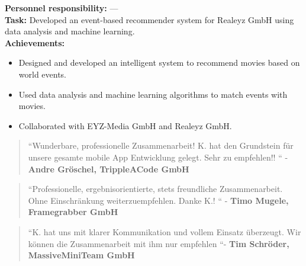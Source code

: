\documentclass[10pt,a4paper,normalphoto]{altacv}
\begin{document}
\begin{fullwidth}
\vspace{1em}


\vspace{2em}

\textbf{Personnel responsibility:} —\\
\textbf{Task:} Developed an event-based recommender system for Realeyz GmbH using data analysis and machine learning.\\
\textbf{Achievements:}
\begin{itemize}
    \item Designed and developed an intelligent system to recommend movies based on world events.
    \item Used data analysis and machine learning algorithms to match events with movies.
    \item Collaborated with EYZ-Media GmbH and Realeyz GmbH.
\end{itemize}

\vspace{1em}



\begin{quote}
``Wunderbare, professionelle Zusammenarbeit! K. hat den Grundstein für unsere gesamte mobile App Entwicklung gelegt. Sehr zu empfehlen!! `` - \textbf{Andre Gröschel, TrippleACode GmbH}\\
\end{quote}
\vspace{.5em}
\begin{quote}
``Professionelle, ergebnisorientierte, stets freundliche Zusammenarbeit. Ohne Einschränkung weiterzuempfehlen. Danke K.! `` - \textbf{Timo Mugele, Framegrabber GmbH}\\
\end{quote}

\vspace{.5em}

\begin{quote}
``K. hat uns mit klarer Kommunikation und vollem Einsatz überzeugt. Wir können die Zusammenarbeit mit ihm nur empfehlen ``- \textbf{Tim Schröder, MassiveMiniTeam GmbH}\\
\end{quote}


\end{fullwidth}
\end{document}
